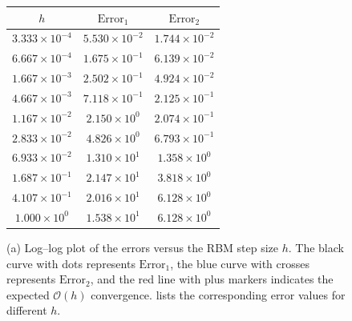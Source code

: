 \documentclass[10pt,a4paper]{amsart}
\begin{document}
\begin{figure}[htbp]
\centering
\begin{minipage}[t]{0.45\textwidth}
  \centering
  \subfloat[]{}
\end{minipage}\hfill
\begin{minipage}[t]{0.45\textwidth}
  \centering
  \label{tab:errors_1}
  \begin{tabular}{c|c|c}
    \toprule
    $\displaystyle h$ & $\displaystyle \text{Error}_1$ & $\displaystyle \text{Error}_2$ \\
    \midrule
    $3.333\times10^{-4}$ & $5.530\times10^{-2}$ & $1.744\times10^{-2}$ \\
    $6.667\times10^{-4}$ & $1.675\times10^{-1}$ & $6.139\times10^{-2}$ \\
    $1.667\times10^{-3}$ & $2.502\times10^{-1}$ & $4.924\times10^{-2}$ \\
    $4.667\times10^{-3}$ & $7.118\times10^{-1}$ & $2.125\times10^{-1}$ \\
    $1.167\times10^{-2}$ & $2.150\times10^{0}$  & $2.074\times10^{-1}$ \\
    $2.833\times10^{-2}$ & $4.826\times10^{0}$  & $6.793\times10^{-1}$ \\
    $6.933\times10^{-2}$ & $1.310\times10^{1}$  & $1.358\times10^{0}$ \\
    $1.687\times10^{-1}$ & $2.147\times10^{1}$  & $3.818\times10^{0}$ \\
    $4.107\times10^{-1}$ & $2.016\times10^{1}$  & $6.128\times10^{0}$ \\
    $1.000\times10^{0}$   & $1.538\times10^{1}$  & $6.128\times10^{0}$ \\
    \bottomrule
  \end{tabular}
\end{minipage}
  \caption{(a) Log–log plot of the errors versus the RBM step size $h$. The black curve with dots represents $\text{Error}_1$, the blue curve with crosses represents $\text{Error}_2$, and the red line with plus markers indicates the expected $\mathcal{O}(h)$ convergence.  lists the corresponding error values for different $h$.}
\label{fig:error-convergence}
\end{figure}
\end{document}
